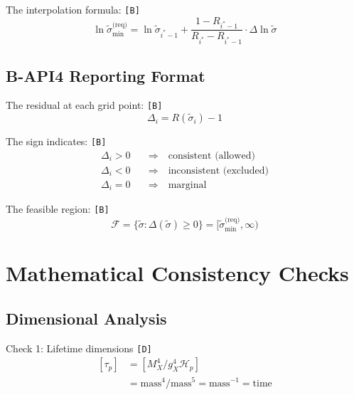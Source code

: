 \documentclass[11pt,a4paper]{article}
\newcommand{\tagD}{\textcolor{green!50!black}{\texttt{[D]}}}
\newcommand{\tagB}{\textcolor{purple!70!black}{\texttt{[B]}}}
\theoremstyle{definition}
\begin{document}
The interpolation formula: \tagB{}
\begin{equation}
\label{eq:api3-interp}
\ln\tilde{\sigma}_{\min}^{\text{(req)}} = \ln\tilde{\sigma}_{i^*-1} + \frac{1 - R_{i^*-1}}{R_{i^*} - R_{i^*-1}} \cdot \Delta\ln\tilde{\sigma}
\end{equation}

\subsection{B-API4 Reporting Format}
\label{subsec:b-api4-detail}

The residual at each grid point: \tagB{}
\begin{equation}
\label{eq:api4-residual}
\Delta_i = R(\tilde{\sigma}_i) - 1
\end{equation}

The sign indicates: \tagB{}
\begin{align}
\label{eq:api4-sign-pos}
\Delta_i > 0 &\quad \Rightarrow \quad \text{consistent (allowed)} \\
\label{eq:api4-sign-neg}
\Delta_i < 0 &\quad \Rightarrow \quad \text{inconsistent (excluded)} \\
\label{eq:api4-sign-zero}
\Delta_i = 0 &\quad \Rightarrow \quad \text{marginal}
\end{align}

The feasible region: \tagB{}
\begin{equation}
\label{eq:api4-feasible}
\mathcal{F} = \{\tilde{\sigma} : \Delta(\tilde{\sigma}) \geq 0\} = [\tilde{\sigma}_{\min}^{\text{(req)}}, \infty)
\end{equation}

\section{Mathematical Consistency Checks}
\label{sec:math-checks}

\subsection{Dimensional Analysis}
\label{subsec:dim-checks}

Check 1: Lifetime dimensions \tagD{}
\begin{align}
\label{eq:dim-check-1}
[\tau_p] &= [M_X^4/g_X^4 \mathcal{H}_p] \\
\label{eq:dim-check-2}
&= \text{mass}^4 / \text{mass}^5 = \text{mass}^{-1} = \text{time}
\end{align}
\end{document}
